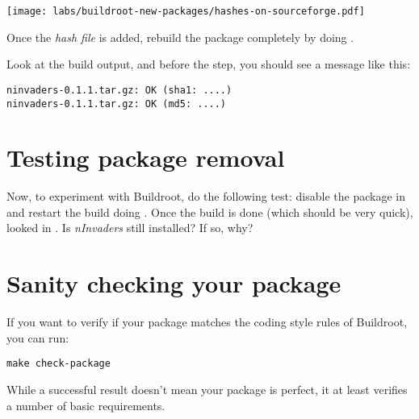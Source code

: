 \begin{center}
\texttt{[image: labs/buildroot-new-packages/hashes-on-sourceforge.pdf]}
\end{center}

Once the {\em hash file} is added, rebuild the package completely by
doing .

Look at the build output, and before the  step, you should see a message like this:

\begin{verbatim}
ninvaders-0.1.1.tar.gz: OK (sha1: ....)
ninvaders-0.1.1.tar.gz: OK (md5: ....)
\end{verbatim}

\section{Testing package removal}

Now, to experiment with Buildroot, do the following test: disable the
 package in  and restart the build
doing . Once the build is done (which should be very
quick), looked in . Is {\em nInvaders} still
installed? If so, why?

\section{Sanity checking your package}

If you want to verify if your package matches the coding style rules
of Buildroot, you can run:

\begin{verbatim}
make check-package
\end{verbatim}

While a successful result doesn't mean your package is perfect, it at
least verifies a number of basic requirements.

